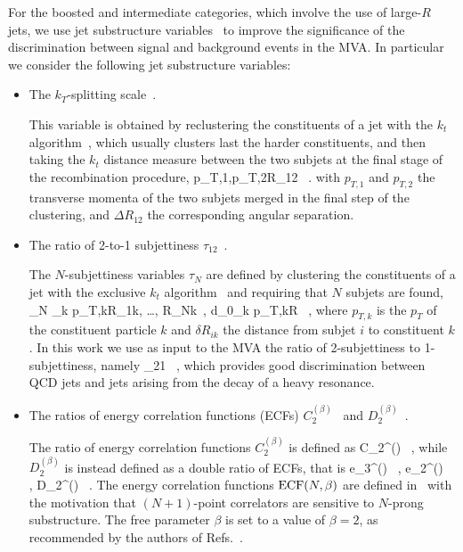 For the   boosted and intermediate categories,
which involve the use of large-$R$ jets,
we use jet substructure variables~\cite{Salam:2009jx,Aad:2013gja} to
improve the significance of the discrimination between signal and background
events in the MVA.
%
In particular we  consider the following jet
substructure variables:
\begin{itemize}
\item The $k_T$-splitting scale~\cite{Butterworth:2002tt,Butterworth:2008iy}.

  This variable is obtained by reclustering the constituents of a jet with the
  $k_t$ algorithm~\cite{Ellis:1993tq},
  which usually clusters last the harder constituents, and then
  taking the $k_t$ distance measure between the two subjets at the final stage of the recombination
  procedure,
  \be
  \label{eq:ktsplitting}
 \lp p_{T,1},p_{T,2}\rp \cdot \Delta R_{12} \, .
\ee
with $p_{T,1}$ and $p_{T,2}$ the transverse momenta of the two subjets merged
in the final step of the clustering, and $\Delta R_{12}$ the corresponding
angular separation.
  
\item The ratio of 2-to-1 subjettiness $\tau_{12}$~\cite{Thaler:2010tr,Thaler:2011gf}.

  The $N$-subjettiness variables $\tau_N$ are defined by clustering the constituents
  of a jet with the exclusive $k_t$ algorithm~\cite{Catani:1993hr}
  and requiring that $N$ subjets are found,
  \be
  \tau_N \equiv {} \sum_k p_{T,k}\lp \delta R_{1k}, \ldots,
  \delta R_{Nk}\rp \, , \qquad d_0\equiv \sum_k p_{T,k}\cdot R \, ,
  \ee
  where $p_{T,k}$ is the $p_T$ of the constituent particle $k$ and $\delta R_{ik}$ the distance from
  subjet $i$ to constituent $k$.
  In this work we use as input to the MVA the ratio of 2-subjettiness to 1-subjettiness, namely
  \be
  \label{eq:tau21}
\tau_{21} \equiv {} \, ,
  \ee
  which provides good discrimination 
  between QCD jets and jets arising from the decay of
  a heavy resonance.
  
\item The ratios of energy correlation functions (ECFs)  $C^{(\beta)}_2$~\cite{Larkoski:2013eya} and
  $D_2^{(\beta)}$~\cite{Larkoski:2014gra}.

  The ratio of energy correlation functions $C_2^{(\beta)}$ is defined as
  \be
  \label{eq:c2}
C_2^{(\beta)} \equiv {} \, ,
\ee
while $D_2^{(\beta)}$ is instead defined as a double ratio of ECFs, that is
\be
e_3^{(\beta)}\equiv {} \, , \quad
  e_2^{(\beta)}\equiv {} \, , \quad
  \label{eq:d2}
D_2^{(\beta)} \equiv {} \, .
\ee
The energy correlation functions ${\rm ECF}(N,\beta)$ are defined
  in~\cite{Larkoski:2013eya} with the motivation that $(N+1)$-point correlators
  are sensitive to $N$-prong substructure.
  The free parameter $\beta$ is set to a value of $\beta=2$,
  as recommended by the authors of Refs.~\cite{Larkoski:2013eya,Larkoski:2014gra}.
\end{itemize}
